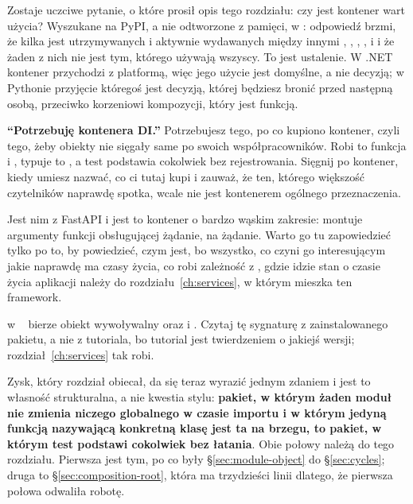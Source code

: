 \noindent
Zostaje uczciwe pytanie, o które prosił opis tego rozdziału: czy jest
kontener wart użycia? Wyszukane na PyPI, a nie odtworzone z pamięci, w
\pinnedon{}: odpowiedź brzmi, że kilka jest utrzymywanych i aktywnie
wydawanych \dash{} między innymi , ,
, ,  i  \dash{} i że żaden z nich
nie jest tym, którego używają wszyscy. To jest ustalenie. W .NET kontener
przychodzi z platformą, więc jego użycie jest domyślne, a nie decyzją; w
Pythonie przyjęcie któregoś jest decyzją, której będziesz bronić przed
następną osobą, przeciwko korzeniowi kompozycji, który jest funkcją.

\begin{trapbox}
\textbf{\enquote{Potrzebuję kontenera DI.}} Potrzebujesz tego, po co
kupiono kontener, czyli tego, żeby obiekty nie sięgały same po swoich
współpracowników. Robi to funkcja i , typuje to
, a test podstawia cokolwiek bez rejestrowania. Sięgnij po
kontener, kiedy umiesz nazwać, co ci tutaj kupi \dash{} i zauważ, że ten,
którego większość czytelników naprawdę spotka, wcale nie jest kontenerem
ogólnego przeznaczenia.
\end{trapbox}

\noindent
Jest nim  z FastAPI i jest to kontener o bardzo wąskim
zakresie: montuje argumenty funkcji obsługującej żądanie, na żądanie. Warto
go tu zapowiedzieć tylko po to, by powiedzieć, czym jest, bo wszystko, co
czyni go interesującym \dash{} jakie naprawdę ma czasy życia, co robi
zależność z , gdzie idzie stan o czasie życia aplikacji \dash{}
należy do rozdziału~\ref{ch:services}, w którym mieszka ten framework.

\begin{versionbox}
 w ~\fastapiver{} bierze obiekt wywoływalny oraz
 i . Czytaj tę sygnaturę z zainstalowanego
pakietu, a nie z tutoriala, bo tutorial jest twierdzeniem o jakiejś wersji;
rozdział~\ref{ch:services} tak robi.
\end{versionbox}

\noindent
Zysk, który rozdział obiecał, da się teraz wyrazić jednym zdaniem i jest to
własność strukturalna, a nie kwestia stylu: \textbf{pakiet, w którym żaden
moduł nie zmienia niczego globalnego w czasie importu i w którym jedyną
funkcją nazywającą konkretną klasę jest ta na brzegu, to pakiet, w którym
test podstawi cokolwiek bez łatania}. Obie połowy należą do tego rozdziału.
Pierwsza jest tym, po co były \S\ref{sec:module-object} do
\S\ref{sec:cycles}; druga to \S\ref{sec:composition-root}, która ma
trzydzieści linii dlatego, że pierwsza połowa odwaliła robotę.
